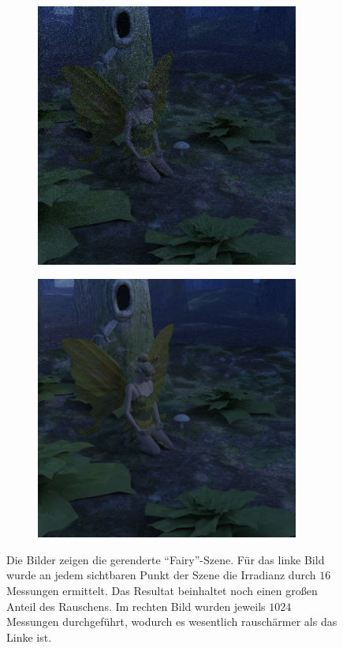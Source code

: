 		\begin{figure}
			\begin{subfigure}[b]{0.5\textwidth}
				\center
				\includegraphics[width=0.95\textwidth]{pic/noise-fairy-high.png}
			\end{subfigure}
			\begin{subfigure}[b]{0.5\textwidth}
				\center
				\includegraphics[width=0.95\textwidth]{pic/noise-fairy-low.png}
			\end{subfigure}
			\caption[Rauschen durch Path Tracing anhand der \enquote{Fairy}-Szene]{Die Bilder zeigen die gerenderte \enquote{Fairy}-Szene. Für das linke Bild wurde an jedem sichtbaren Punkt der Szene die Irradianz durch $16$ Messungen ermittelt. Das Resultat beinhaltet noch einen großen Anteil des Rauschens. Im rechten Bild wurden jeweils $1024$ Messungen durchgeführt, wodurch es wesentlich rauschärmer als das Linke ist.}
			\label{fig:fairy-noise}
		\end{figure}

